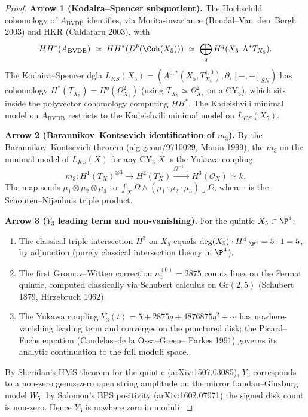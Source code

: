 \begin{proof}
\textbf{Arrow 1 (Kodaira--Spencer subquotient).} The Hochschild
cohomology of $A_{\mathrm{BVDB}}$ identifies, via Morita-invariance
(Bondal--Van~den~Bergh 2003) and HKR (Caldararu 2003), with
\[
 HH^*(A_{\mathrm{BVDB}}) \;\simeq\; HH^*(D^b(\Coh(X_5))) \;\simeq\;
 \bigoplus_q H^q(X_5, \Lambda^* T_{X_5}).
\]
The Kodaira--Spencer dgla $L_{KS}(X_5) = (A^{0,*}(X_5, T^{1,0}_{X_5}),
\bar\partial, [-,-]_{SN})$ has cohomology $H^*(T_{X_5}) =
H^q(\Omega^2_{X_5})$ (using $T_{X_5}\simeq \Omega^2_{X_5}$ on a CY$_3$),
which sits inside the polyvector cohomology computing $HH^*$. The
Kadeishvili minimal model on $A_{\mathrm{BVDB}}$ restricts to the
Kadeishvili minimal model on $L_{KS}(X_5)$.

\textbf{Arrow 2 (Barannikov--Kontsevich identification of $m_3$).} By
the Barannikov--Kontsevich theorem (alg-geom/9710029, Manin 1999), the
$m_3$ on the minimal model of $L_{KS}(X)$ for any CY$_3$ $X$ is the
Yukawa coupling
\[
 m_3 \colon H^1(T_X)^{\otimes 3} \to H^2(T_X)
 \xrightarrow{\Omega^{-1}\lrcorner} H^3(\mathcal{O}_X) \simeq k.
\]
The map sends $\mu_1\otimes \mu_2\otimes \mu_3$ to
$\int_X \Omega \wedge (\mu_1\cdot \mu_2\cdot \mu_3)\lrcorner \Omega$,
where $\cdot$ is the Schouten--Nijenhuis triple product.

\textbf{Arrow 3 ($Y_3$ leading term and non-vanishing).} For the quintic
$X_5\subset \P^4$:
\begin{enumerate}[label=\textup{(\roman*)}]
 \item The classical triple intersection $H^3$ on $X_5$ equals
 $\deg(X_5)\cdot H^4|_{\P^4} = 5\cdot 1 = 5$, by adjunction
 (purely classical intersection theory in $\P^4$).
 \item The first Gromov--Witten correction $n_1^{(0)} = 2875$ counts
 lines on the Fermat quintic, computed classically via Schubert
 calculus on $\mathrm{Gr}(2,5)$ (Schubert 1879, Hirzebruch 1962).
 \item The Yukawa coupling $Y_3(t) = 5 + 2875 q + 4876875 q^2 + \cdots$
 has nowhere-vanishing leading term and converges on the punctured
 disk; the Picard--Fuchs equation (Candelas--de la Ossa--Green--
 Parkes 1991) governs its analytic continuation to the full
 moduli space.
\end{enumerate}
By Sheridan's HMS theorem for the quintic (arXiv:1507.03085), $Y_3$
corresponds to a non-zero genus-zero open string amplitude on the mirror
Landau--Ginzburg model $W_5$; by Solomon's BPS positivity (arXiv:1602.07071)
the signed disk count is non-zero. Hence $Y_3$ is nowhere zero in moduli.


\end{proof}
